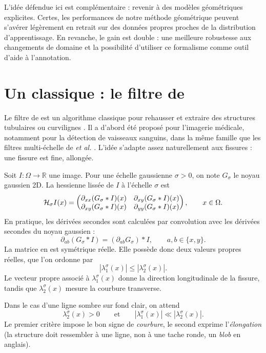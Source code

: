 L'idée défendue ici est complémentaire : revenir à des modèles géométriques explicites. 
Certes, les performances de notre méthode géométrique peuvent s'avérer légèrement en retrait sur des données propres proches de la distribution d'apprentissage. En revanche, le gain est double : une meilleure robustesse aux changements de domaine et la possibilité d'utiliser ce formalisme comme outil d'aide à l'annotation.

\section{Un classique : le filtre de \Frangi}
\label{sec:chapIII_frangi_classique}

Le filtre de \Frangi{} est un algorithme classique pour rehausser et extraire des structures tubulaires ou curvilignes \cite{Frangi1998}. Il a d'abord été proposé pour l'imagerie médicale, notamment pour la détection de vaisseaux sanguins, dans la même famille que les filtres multi-échelle de  \emph{et al.} \cite{Sato1998}. L'idée s'adapte assez naturellement aux fissures : une fissure est fine, allongée. %

Soit $I : \Omega \to \mathbb R$ une image. Pour une échelle gaussienne $\sigma>0$, on note $G_\sigma$ le noyau gaussien 2D. La hessienne lissée de $I$ à l'échelle $\sigma$ est
\begin{equation}
    \mathcal H_\sigma I(x)
    =
    \begin{pmatrix}
        \partial_{xx}(G_\sigma * I)(x) & \partial_{xy}(G_\sigma * I)(x) \\
        \partial_{xy}(G_\sigma * I)(x) & \partial_{yy}(G_\sigma * I)(x)
    \end{pmatrix},
    \qquad x\in\Omega.
    \label{eq:chapIII_hessienne}
\end{equation}
En pratique, les dérivées secondes sont calculées par convolution avec les dérivées secondes du noyau gaussien :
\[
    \partial_{ab}(G_\sigma * I) = (\partial_{ab}G_\sigma)*I,
    \qquad a,b\in\{x,y\}.
\]
La matrice en  est symétrique réelle. Elle possède donc deux valeurs propres réelles, que l'on ordonne par
\[
    |\lambda_1^\sigma(x)| \le |\lambda_2^\sigma(x)|.
\]
Le vecteur propre associé à $\lambda_1^\sigma(x)$ donne la direction longitudinale de la fissure, tandis que $\lambda_2^\sigma(x)$ mesure la courbure transverse.

Dans le cas d'une ligne sombre sur fond clair, on attend
\[
    \lambda_2^\sigma(x)>0
    \qquad\text{et}\qquad
    |\lambda_1^\sigma(x)| \ll |\lambda_2^\sigma(x)|.
\]
Le premier critère impose le bon signe de \emph{courbure}, le second exprime l'\emph{élongation} (la structure doit ressembler à une ligne, non à une tache ronde, un \emph{blob} en anglais).

